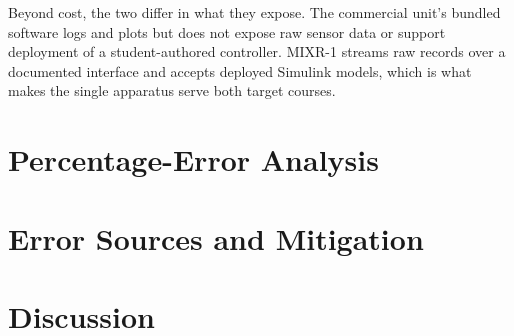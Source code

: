Beyond cost, the two differ in what they expose. The commercial unit's bundled software logs and plots but does not expose raw sensor data or support deployment of a student-authored controller. MIXR-1 streams raw records over a documented interface and accepts deployed Simulink models, which is what makes the single apparatus serve both target courses.


\section{Percentage-Error Analysis}
\label{sec:val-error}




\section{Error Sources and Mitigation}
\label{sec:val-errorsources}



\section{Discussion}
\label{sec:val-discussion}

